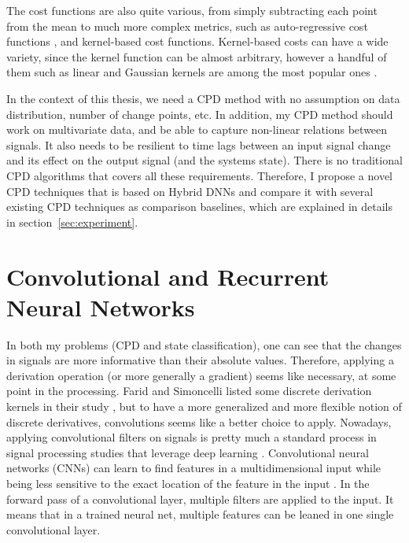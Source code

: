 The cost functions are also quite various, from simply subtracting each point from the mean to much more complex metrics, such as auto-regressive cost functions \cite{angelosante2012group}, and kernel-based cost functions. Kernel-based costs can have a wide variety, since the kernel function can be almost arbitrary, however a handful of them such as linear and Gaussian kernels are among the most popular ones \cite{Truong2018ChangePointSurvey}.

In the context of this thesis, we need a CPD method with no assumption on data distribution, number of change points, etc. 
In addition, my CPD method should work on multivariate data, and be able to capture non-linear relations between signals. 
It also needs to be resilient to time lags between an input signal change and its effect on the output signal (and the systems state). There is no traditional CPD algorithms that covers all these requirements.
Therefore, I propose a novel CPD techniques that is based on Hybrid DNNs and compare it with several existing CPD techniques as comparison baselines, which are explained in details in section~\ref{sec:experiment}.   


\section{Convolutional and Recurrent Neural Networks}
In both my problems (CPD and state classification), one can see that the changes in signals are more informative than their absolute values. Therefore, applying a derivation operation (or more generally a gradient) seems like necessary, at some point in the processing. Farid and Simoncelli listed some discrete derivation kernels in their study \cite{Farid2004}, but to have a more generalized and more flexible notion of discrete derivatives, convolutions seems like a better choice to apply. 
Nowadays, applying convolutional filters on signals is pretty much a standard process in signal processing studies that leverage deep learning \cite{morales2016deep, zeng2014convolutional, yang2015deep}. Convolutional neural networks (CNNs) can learn to find features in a multidimensional input while being less sensitive to the exact location of the feature in the input \cite{lecun2015deep}. In the forward pass of a convolutional layer, multiple filters are applied to the input. %
It means that in a trained neural net, multiple features can be leaned in one single convolutional layer.

